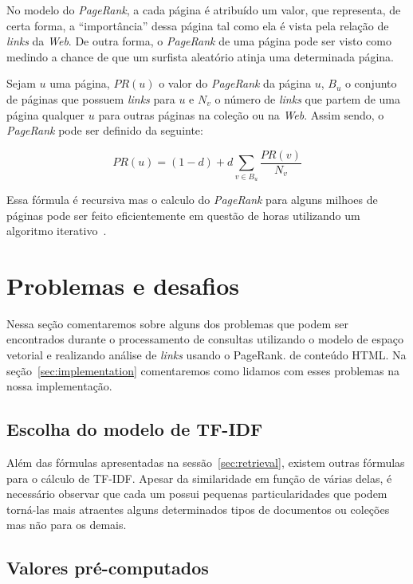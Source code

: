 \documentclass[10pt,twocolumn]{article}
\begin{document}
No modelo do \emph{PageRank}, a cada página é atribuído um valor, que
representa, de certa forma, a ``importância'' dessa página tal como ela
é vista pela relação de \emph{links} da \emph{Web}. De outra forma, o
\emph{PageRank} de uma página pode ser visto como medindo a chance de
que um surfista aleatório atinja uma determinada página.

Sejam \(u\) uma página, \(PR(u)\) o valor do \emph{PageRank} da página
\(u\), \(B_u\) o conjunto de páginas que possuem
\emph{links} para \(u\) e \(N_v\) o número de \emph{links} que
partem de uma página qualquer \(u\) para outras páginas na coleção ou na
\emph{Web}. Assim sendo, o \emph{PageRank} pode ser definido da
seguinte:

\begin{equation}
 PR(u) = (1-d) + d\sum_{v \in B_u}\frac{PR(v)}{N_v}
\label{eq:pagerank}
\end{equation}

Essa fórmula é recursiva mas o calculo do \emph{PageRank} para alguns
milhoes de páginas pode ser feito eficientemente em questão de horas
utilizando um algoritmo iterativo~\cite{brin1998google}.




\section{Problemas e desafios}

Nessa seção comentaremos sobre alguns dos problemas que podem ser
encontrados durante o processamento de consultas utilizando o modelo de
espaço vetorial e realizando análise de \emph{links} usando o PageRank.
de conteúdo HTML. Na
seção~\ref{sec:implementation} comentaremos como lidamos com esses
problemas na nossa implementação.

\subsection{Escolha do modelo de TF-IDF}

Além das fórmulas apresentadas na sessão~\ref{sec:retrieval}, existem
outras fórmulas para o cálculo de TF-IDF. Apesar da similaridade em
função de várias delas, é necessário observar que cada um possui
pequenas particularidades que podem torná-las mais atraentes alguns
determinados tipos de documentos ou coleções mas não para os demais.

\subsection{Valores pré-computados}
\end{document}

